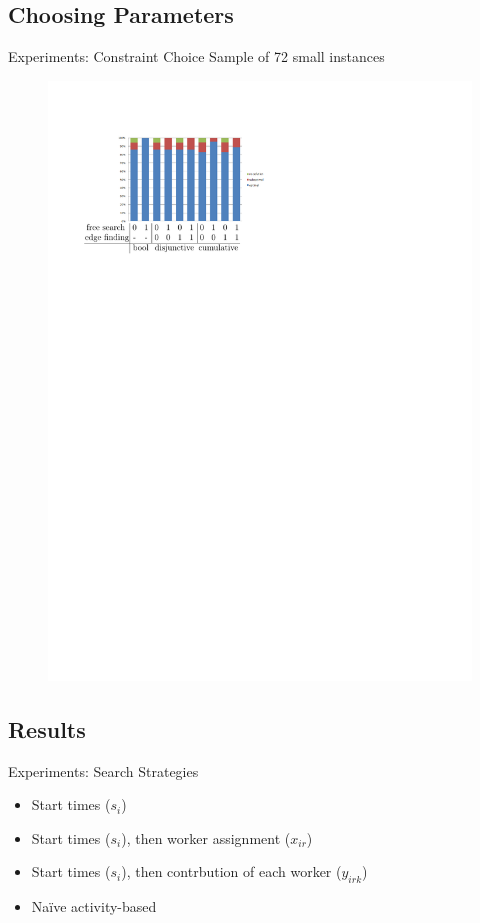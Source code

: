 \documentclass{beamer}
\begin{document}
\subsection{Choosing Parameters}
\begin{frame}{Experiments: Constraint Choice}
	Sample of 72 small instances\pause
	\begin{figure}[H]
		\includegraphics[width=0.8\linewidth]{images/constChoice.pdf}
	\end{figure}
\end{frame}

\subsection{Results}
\begin{frame}{Experiments: Search Strategies}
	\begin{itemize}
		\item \pause Start times ($s_i$)
		\vspace{2mm}
		\item \pause Start times ($s_i$), then worker assignment ($x_{ir}$)
		\vspace{2mm}
		\item \pause Start times ($s_i$), then contrbution of each worker ($y_{irk}$)
		\vspace{2mm}
		\item \pause Na\"{i}ve activity-based
	\end{itemize}
\end{frame}
\end{document}
